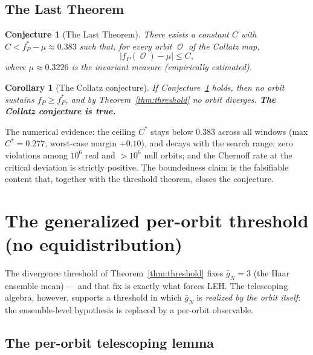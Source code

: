 \documentclass[12pt,reqno]{amsart}
\theoremstyle{plain}
\newtheorem{corollary}[theorem]{Corollary}
\newtheorem{conjecture}[theorem]{Conjecture}
\theoremstyle{definition}
\newcommand{\fP}{f_P}
\newcommand{\fPstar}{f_P^*}
\DeclareMathOperator{\Orb}{\mathcal{O}}
\begin{document}
\subsection{The Last Theorem}

\begin{conjecture}[The Last Theorem]\label{conj:last}
There exists a constant $C$ with $C < \fPstar - \mu \approx 0.383$ such that,
for every orbit $\Orb$ of the Collatz map,
\[
|\fP(\Orb) - \mu| \le C,
\]
where $\mu \approx 0.3226$ is the invariant measure (empirically estimated).
\end{conjecture}

\begin{corollary}[The Collatz conjecture]
If Conjecture~\ref{conj:last} holds, then no orbit sustains $\fP \ge \fPstar$,
and by Theorem~\ref{thm:threshold} no orbit diverges. \textbf{The Collatz
conjecture is true.}
\end{corollary}

The numerical evidence: the ceiling $C^*$ stays below $0.383$ across all
windows (max $C^* = 0.277$, worst-case margin $+0.10$), and decays with the
search range; zero violations among $10^6$ real and $>10^6$ null orbits; and
the Chernoff rate at the critical deviation is strictly positive. The
boundedness claim is the falsifiable content that, together with the
threshold theorem, closes the conjecture.

\section{The generalized per-orbit threshold (no equidistribution)}\label{sec:generalized}

The divergence threshold of Theorem~\ref{thm:threshold} fixes $\bar g_N = 3$
(the Haar ensemble mean) --- and that fix is exactly what forces LEH. The
telescoping algebra, however, supports a threshold in which $\bar g_N$ is
\emph{realized by the orbit itself}: the ensemble-level hypothesis is replaced
by a per-orbit observable.

\subsection{The per-orbit telescoping lemma}\label{sec:telescoping}
\end{document}
